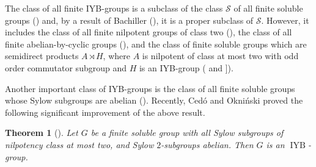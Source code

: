 \documentclass[12pt,a4paper]{article}
\DeclareMathOperator{\IYB}{IYB}
\newtheorem{theorem}{Theorem}
\theoremstyle{definition}
\begin{document}
The class of all finite IYB-groups is a subclass of the class $\mathcal S$ of all finite soluble groups (\cite{EtingofSchedlerSoloviev1999}) and, by a result of Bachiller (\cite{Bachiller2016}), it is a proper subclass of $\mathcal S$. However, it includes the class of all finite nilpotent groups of class two (\cite{AultWatters1973}), the class of all finite abelian-by-cyclic groups (\cite[Corollary~3.10]{CedoJespersRio2010}), and the class of finite soluble
groups which are semidirect products $A \rtimes H$, where $A$ is nilpotent of class at most two with odd order commutator subgroup and $H$ is an IYB-group (\cite[Corollary~4.2 and Corollary~4.3]{MengBallesterEstebanFuster2021} and \cite[Proposition~2.2]{CedoOkninski2025}]).



Another important class of IYB-groups is the class of all finite soluble groups whose Sylow subgroups are abelian (\cite[Corollary~4.3]{DavidGinosar2016}). Recently, Ced\'{o} and Okni\'{n}ski proved the following significant improvement of the above result.



\begin{theorem}[{\cite[Theorem~2.6]{CedoOkninski2025}}]
Let $G$ be a finite soluble group with all Sylow subgroups of nilpotency class at most two, and Sylow $2$-subgroups abelian. Then $G$ is an $\IYB$-group.
\end{theorem}
\end{document}
